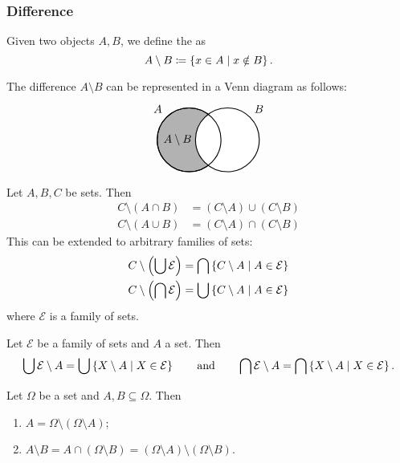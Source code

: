 \subsubsection{Difference}
\begin{definition}
Given two objects $A,B$, we define the  as
\[A\setminus B \coloneqq \left\{ x\in A \;\middle|\; x\notin B \right\}. \]
\end{definition}
The difference $A\setminus B$ can be represented in a Venn diagram as follows:
\[ \begin{tikzpicture}[thick,
    set/.style = {circle,
        minimum size = 2cm}]

\node[set,draw,fill=black!30,label={135:$A$}] (A) at (0,0) {};

\node[set,draw,fill=white,label={45:$B$}] (B) at (1.2,0) {};

\draw (0,0) circle(1cm);

\node at (-0.36,0) {$A\setminus B$};
\end{tikzpicture} \]

\begin{proposition}
Let $A,B,C$ be sets. Then
\begin{align*}
C\setminus (A\cap B) &= (C\setminus A)\cup(C\setminus B) \\
C\setminus (A\cup B) &= (C\setminus A)\cap(C\setminus B)
\end{align*}
This can be extended to arbitrary families of sets:
\begin{align*}
C\setminus\left(\bigcup \mathcal{E}\right) &= \bigcap\left\{ C\setminus A \;\middle|\; A\in\mathcal{E} \right\} \\
C\setminus\left(\bigcap \mathcal{E}\right) &= \bigcup\left\{ C\setminus A \;\middle|\; A\in\mathcal{E} \right\}
\end{align*}
where $\mathcal{E}$ is a family of sets.
\end{proposition}
\begin{lemma}
Let $\mathcal{E}$ be a family of sets and $A$ a set. Then
\[ \bigcup \mathcal{E} \setminus A = \bigcup\left\{ X\setminus A \;\middle|\; X\in\mathcal{E} \right\} \qquad\text{and}\qquad \bigcap \mathcal{E} \setminus A = \bigcap\left\{ X\setminus A \;\middle|\; X\in\mathcal{E} \right\}. \]
\end{lemma}

\begin{lemma} \label{setDifferenceComplement}
Let $\Omega$ be a set and $A,B\subseteq \Omega$. Then
\begin{enumerate}
\item $A = \Omega \setminus (\Omega \setminus A)$;
\item $A\setminus B = A \cap (\Omega\setminus B) = (\Omega \setminus A)\setminus (\Omega \setminus B)$.
\end{enumerate}
\end{lemma}

